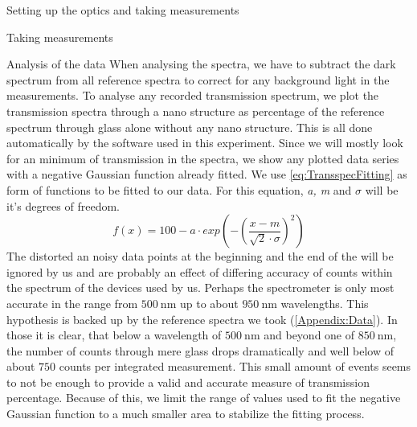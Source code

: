 \documentclass[pdftex, a4paper,11pt, twoside, UKenglish]{report}
\begin{document}
\begin{chapter}{Setting up the optics and taking measurements}
\begin{section}{Taking measurements}
      
    \end{section}
    
  \end{chapter}
  
  
  
  \begin{chapter}{Analysis of the data}
    \label{chp:Analysis}
    When analysing the spectra, we have to subtract the dark spectrum from
    all reference spectra to correct for any background light in the
    measurements.
    To analyse any recorded transmission spectrum, we plot the transmission
    spectra through a nano structure as percentage of the reference spectrum
    through glass alone without any nano structure.
    This is all done automatically by the software used in this experiment.
    Since we will mostly look for an minimum of transmission in the spectra,
    we show any plotted data series with a negative Gaussian function already
    fitted. We use \cref{eq:TransspecFitting} as form of functions to be fitted
    to our data. For this equation, \textit{a, m} and \textit{$\sigma$} will be
    it's degrees of freedom.
    \begin{equation}
      \label{eq:TransspecFitting}
      f(x)=100-a\cdot exp\left(-\left(\frac{x-m}{\sqrt{2}\cdot\sigma}
      \right)^{2}\right)
    \end{equation}
    The distorted an noisy data points at the beginning and the end of the
    will be ignored by us and are probably an effect of differing accuracy
    of counts within the spectrum  of the devices used by us.
    Perhaps the spectrometer is only most accurate in the range from
    $\SI{500}{\nano\meter}$ up to about $\SI{950}{\nano\meter}$ wavelengths.
    This hypothesis is backed up by the reference spectra we took 
    (\cref{Appendix:Data}).
    In those it is clear, that below a wavelength of $\SI{500}{\nano\meter}$
    and beyond one of $\SI{850}{\nano\meter}$, the number of counts through
    mere glass drops dramatically and well below of about $750$ counts per
    integrated measurement. This small amount of events seems to not be enough
    to provide a valid and accurate measure of transmission percentage.
    Because of this,  we limit the range of values used to fit the negative
    Gaussian function to a much smaller area to stabilize the fitting process.

\end{chapter}
\end{document}
